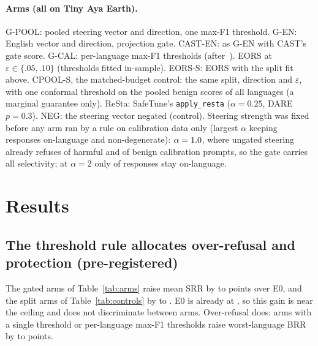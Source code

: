 \documentclass{article}
\begin{document}
\paragraph{Arms (all on Tiny Aya Earth).} G-POOL: pooled steering vector and direction, one max-F1 threshold. G-EN: English vector and direction, projection gate. CAST-EN: as G-EN with CAST's gate score. G-CAL: per-language max-F1 thresholds (after~\citealp{aziz2026action}). EORS at $\varepsilon\in\{.05,.10\}$ (thresholds fitted in-sample). EORS-S: EORS with the split fit above. CPOOL-S, the matched-budget control: the same split, direction and $\varepsilon$, with one conformal threshold on the pooled benign scores of all languages (a marginal guarantee only). ReSta: SafeTune's \texttt{apply\_resta} ($\alpha{=}0.25$, DARE $p{=}0.3$). NEG: the steering vector negated (control). Steering strength was fixed before any arm ran by a rule on calibration data only (largest $\alpha$ keeping responses on-language and non-degenerate): $\alpha=1.0$, where ungated steering already refuses \AlphaOneHrr{} of harmful and \AlphaOneBrr{} of benign calibration prompts, so the gate carries all selectivity; at $\alpha=2$ only \AlphaTwoOnLang{} of responses stay on-language.

\section{Results}
\label{sec:results}

\subsection{The threshold rule allocates over-refusal and protection (pre-registered)}
\label{sec:gate}
\begin{table}[t]
\caption{\textbf{Every gated arm buys a similar safety gain; arms differ in over-refusal.} Paired change against the unrepaired model (E0, Tiny Aya Earth; B1 against B0, Tiny Aya Global), percentage points, Qwen3Guard-4B, 95\% paired bootstrap intervals over prompt ids; point estimates are the statistic on the observed data. Worst-language BRR is the maximum over the ten languages. EORS rows use thresholds fitted on the same prompts as the direction (superseded by EORS-S, Table~\ref{tab:controls}).}
\label{tab:arms}
\centering\resizebox{\linewidth}{!}{}
\end{table}
The gated arms of Table~\ref{tab:arms} raise mean SRR by \ArmsQSrrGainMin{} to \ArmsQSrrGainMax{} points over E0, and the split arms of Table~\ref{tab:controls} by \CtlSrrGainMin{} to \CtlSrrGainMax. E0 is already at \EZeroAhundredSrr, so this gain is near the ceiling and does not discriminate between arms. Over-refusal does: arms with a single threshold or per-language max-F1 thresholds raise worst-language BRR by \ArmsQMaxBrrMin{} to \ArmsQMaxBrrMax{} points.
\end{document}
